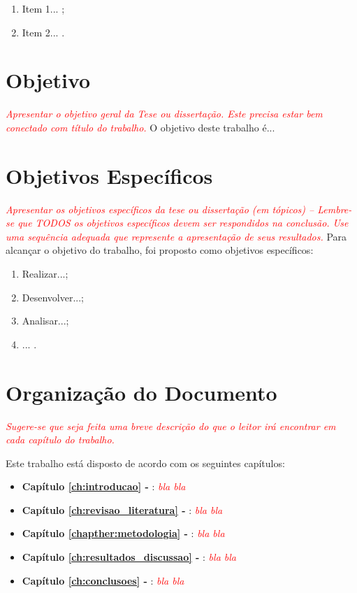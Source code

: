 \lipsum[2-2]

\begin{enumerate}
    \item Item 1... ;
    \item Item 2... .
\end{enumerate}

\lipsum[3-3]

\section{Objetivo}
\label{section:objetivo}

\textit{\textcolor{red}{Apresentar o objetivo geral da Tese ou dissertação. Este precisa estar bem conectado com título do trabalho.}} O objetivo deste trabalho é...

\section{Objetivos Específicos}
\textit{\textcolor{red}{Apresentar os objetivos específicos da tese ou dissertação (em tópicos) – Lembre-se que TODOS os objetivos específicos devem ser respondidos na conclusão. Use uma sequência adequada que represente a apresentação de seus resultados.}}
Para alcançar o objetivo do trabalho, foi proposto como objetivos específicos:
\begin{enumerate}
    \item Realizar...;
    \item Desenvolver...;
    \item Analisar...;
    \item ... .
\end{enumerate}

\section{Organização do Documento}
\label{section:organizacao}
\textit{\textcolor{red}{Sugere-se que seja feita uma breve descrição do que o leitor irá encontrar em cada capítulo do trabalho.}}

Este trabalho está disposto de acordo com os seguintes capítulos:

\begin{itemize}
    \item \textbf{Capítulo \ref{ch:introducao} - }: \textit{\textcolor{red}{bla bla}}
  
    \item \textbf{Capítulo \ref{ch:revisao_literatura} - }: \textit{\textcolor{red}{bla bla}}
  
    \item \textbf{Capítulo \ref{chapther:metodologia} - }: \textit{\textcolor{red}{bla bla}}
    
    \item \textbf{Capítulo \ref{ch:resultados_discussao} - }: \textit{\textcolor{red}{bla bla}}
    
    \item \textbf{Capítulo \ref{ch:conclusoes} - }: \textit{\textcolor{red}{bla bla}}
\end{itemize}